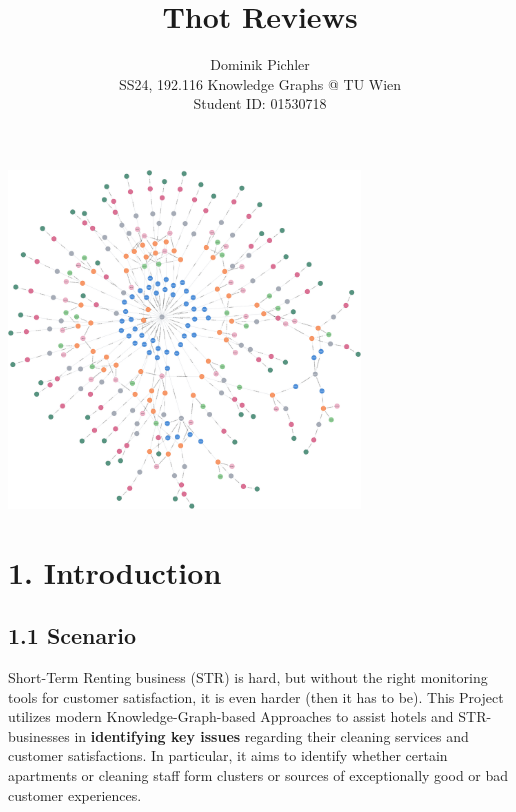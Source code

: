 \documentclass[
]{article}
\author{}
\date{}
\begin{document}
\title{Thot Reviews}
\author{Dominik Pichler \\ SS24, 192.116 Knowledge Graphs @ TU Wien \\ Student ID: 01530718}
\date{}

\maketitle


\vspace*{10mm}


\begin{center}
  \includegraphics[width=0.7\textwidth]{drawings/graph_fully_con.png}
\end{center}


\pagebreak

\section{1. Introduction}\label{introduction}

\subsection{1.1 Scenario}\label{scenario}

Short-Term Renting business (STR) is hard, but without the right
monitoring tools for customer satisfaction, it is even harder (then it
has to be). This Project utilizes modern Knowledge-Graph-based
Approaches to assist hotels and STR-businesses in \textbf{identifying
key issues} regarding their cleaning services and customer
satisfactions. In particular, it aims to identify whether certain
apartments or cleaning staff form clusters or sources of exceptionally
good or bad customer experiences.
\end{document}
